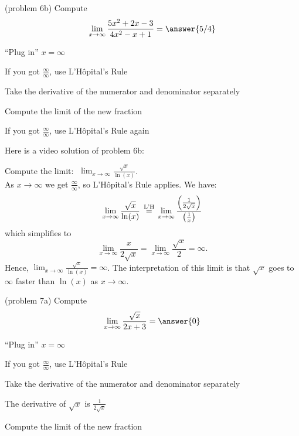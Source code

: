 \documentclass[handout]{ximera}
\begin{document}
\begin{problem}(problem 6b)
  Compute
  \[
  \lim_{x \to \infty} \frac{5x^2 + 2x - 3}{4x^2 - x + 1} = \answer{5/4}
  \]
  
    \begin{hint}
      ``Plug in'' $x=\infty$
    \end{hint}
    \begin{hint}
      If you got $\frac{\infty}{\infty}$, use L'H\^{o}pital's Rule
    \end{hint}
    \begin{hint}
      Take the derivative of the numerator and denominator separately
    \end{hint}
		\begin{hint}
      Compute the limit of the new fraction
    \end{hint}
		\begin{hint}
		  If you got $\frac{\infty}{\infty}$, use L'H\^{o}pital's Rule again
	  \end{hint}
		
\end{problem}

Here is a video solution of  problem 6b:
\begin{foldable}
\end{foldable}

\begin{example}[example 7]
Compute the limit:  $\displaystyle{\;\lim_{x \to \infty} \frac{\sqrt{x}}{\ln(x)}}$.\\
As $x \to \infty$ we get $\frac{\infty}{\infty}$, so L'H\^{o}pital's Rule applies.
We have:
\[\lim_{x \to \infty} \frac{\sqrt x}{\ln(x)} \,\overset{\scriptsize\text{L'H}}{=}\,
\lim_{x \to \infty}\frac{\left(\frac{1}{2\sqrt x}\right)}{\left(\frac{1}{x}\right)}\]
which simplifies to 
\[\lim_{x\to\infty} \frac{x}{2\sqrt x} = \lim_{x\to\infty}\frac{\sqrt x}{2} = \infty.\]
Hence, $\lim_{x\to\infty} \frac{\sqrt x}{\ln(x)} = \infty$.
The interpretation of this limit is that $\sqrt x$ goes to $\infty$ faster than $\ln(x)$ as $x\to\infty$.
\end{example}

\begin{problem}(problem 7a)
  Compute
  \[
  \lim_{x \to \infty} \frac{\sqrt x}{2x + 3} = \answer{0}
  \]
  
    \begin{hint}
      ``Plug in'' $x=\infty$
    \end{hint}
    \begin{hint}
      If you got $\frac{\infty}{\infty}$, use L'H\^{o}pital's Rule
    \end{hint}
    \begin{hint}
      Take the derivative of the numerator and denominator separately
    \end{hint}
		\begin{hint}
		  The derivative of $\sqrt x$ is $\frac{1}{2\sqrt x}$
	  \end{hint}
		\begin{hint}
      Compute the limit of the new fraction
    \end{hint}
	
\end{problem}
\end{document}
